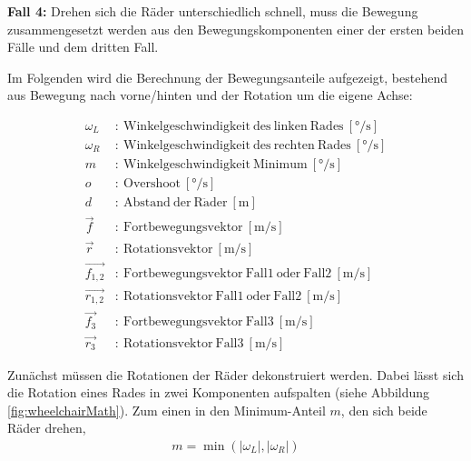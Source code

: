\textbf{Fall 4:} Drehen sich die Räder unterschiedlich schnell, muss die Bewegung zusammengesetzt werden aus den Bewegungskomponenten einer der ersten beiden Fälle und dem dritten Fall.

Im Folgenden wird die Berechnung der Bewegungsanteile aufgezeigt, bestehend aus Bewegung nach vorne/hinten und der Rotation um die eigene Achse:

\begin{align}
    \omega_L      & : \ \mathrm{Winkelgeschwindigkeit\ des\ linken\ Rades}\ [\si{\degree/\second}]  \\
    \omega_R      & : \ \mathrm{Winkelgeschwindigkeit\ des\ rechten\ Rades}\ [\si{\degree/\second}] \\
    m             & : \ \mathrm{Winkelgeschwindigkeit\ Minimum}\ [\si{\degree/\second}]             \\
    o             & : \ \mathrm{Overshoot}\ [\si{\degree/\second}]                                  \\
    d             & : \ \mathrm{Abstand\ der\ R\ddot{a}der}\ [\si{\metre}]                          \\
    \vec{f}       & : \ \mathrm{Fortbewegungsvektor}\ [\si{\metre/\second}]                         \\
    \vec{r}       & : \ \mathrm{Rotationsvektor}\ [\si{\metre/\second}]                             \\
    \vec{f_{1,2}} & : \ \mathrm{Fortbewegungsvektor\ Fall1\ oder\ Fall2}\ [\si{\metre/\second}]     \\
    \vec{r_{1,2}} & : \ \mathrm{Rotationsvektor\ Fall1\ oder\ Fall2}\ [\si{\metre/\second}]         \\
    \vec{f_{3}}   & : \ \mathrm{Fortbewegungsvektor\ Fall3}\ [\si{\metre/\second}]                  \\
    \vec{r_{3}}   & : \ \mathrm{Rotationsvektor\ Fall3}\ [\si{\metre/\second}]
\end{align}



Zunächst müssen die Rotationen der Räder dekonstruiert werden.
Dabei lässt sich die Rotation eines Rades in zwei Komponenten aufspalten (siehe Abbildung \ref{fig:wheelchairMath}).
Zum einen in den Minimum-Anteil $m$, den sich beide Räder drehen,
\begin{align}
    m = \min{(\left| \omega_L \right|,\left| \omega_R\right|)}
\end{align}

